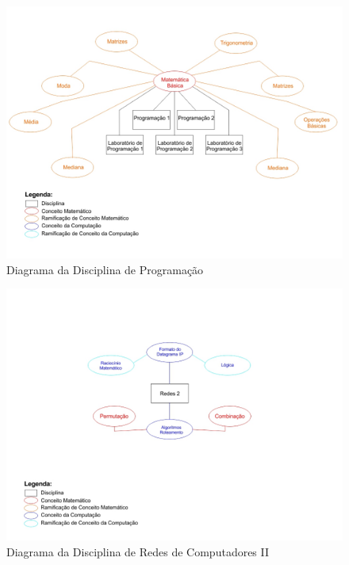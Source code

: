 \documentclass[12pt,a4paper]{article}
\begin{document}
\begin{figure}[!h]
	\centering
	\includegraphics[scale=0.4]{imagens/Programacao.jpg} 
	\caption{Diagrama da Disciplina de Programação}
\end{figure}

\begin{figure}[!h]
	\centering
	\includegraphics[scale=0.5]{imagens/R2.jpg} 
	\caption{Diagrama da Disciplina de Redes de Computadores II}
\end{figure}
\end{document}
